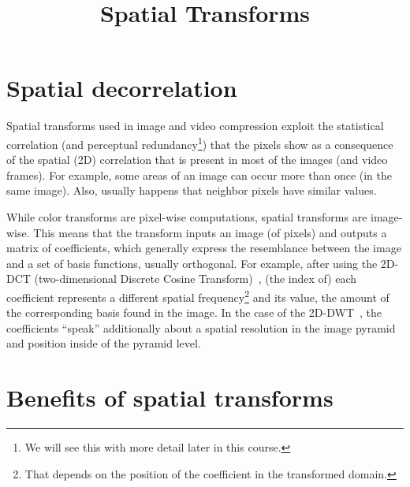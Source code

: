 
\title{Spatial Transforms}

\maketitle

\tableofcontents

\section{Spatial decorrelation}

Spatial transforms used in image and video compression exploit the
statistical correlation (and perceptual redundancy\footnote{We will
  see this with more detail later in this course.}) that the pixels
show as a consequence of the spatial (2D) correlation that is present
in most of the images (and video frames). For example, some areas of
an image can occur more than once (in the same image). Also, usually
happens that neighbor pixels have similar values.

While color transforms are pixel-wise computations, spatial transforms
are image-wise. This means that the transform inputs an image (of
pixels) and outputs a matrix of coefficients, which generally express
the resemblance between the image and a set of basis functions,
usually orthogonal. For example, after using the 2D-DCT
(two-dimensional Discrete Cosine Transform)~\cite{vruiz__DCT}, (the
index of) each coefficient represents a different spatial
frequency\footnote{That depends on the position of the coefficient in
  the transformed domain.} and its value, the amount of the
corresponding basis found in the image. In the case of the
2D-DWT~\cite{vruiz__DWT}, the coefficients ``speak'' additionally
about a spatial resolution in the image pyramid and position inside of
the pyramid level.


\section{Benefits of spatial transforms}

